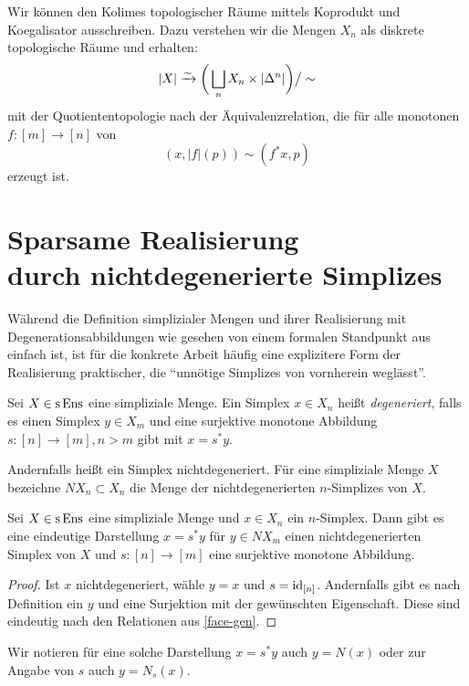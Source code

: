 Wir können den Kolimes topologischer Räume mittels Koprodukt und
Koegalisator ausschreiben. Dazu verstehen wir die Mengen $X_n$ als
diskrete topologische Räume und erhalten:
\[ |X| \xrightarrow[]{\sim} \bigg( \bigsqcup_n X_n \times |\Delta^n| \bigg) \big/ \sim \]
mit der Quotiententopologie nach der Äquivalenzrelation, die für alle
monotonen $f: [m] \to [n]$ von 
\[ (x, |f|(p)) \sim (f^* x, p) \]
erzeugt ist.

\section[Sparsame Realisierung durch nichtdegenerierte Simplizes]
        {\texorpdfstring{Sparsame Realisierung\\durch
            nichtdegenerierte Simplizes}
          {Sparsame Realisierung durch nichtdegenerierte Simplizes}}

Während die Definition simplizialer Mengen und ihrer Realisierung mit
Degenerationsabbildungen wie gesehen von einem formalen Standpunkt aus
einfach ist, ist für die konkrete Arbeit häufig eine explizitere Form
der Realisierung praktischer, die ``unnötige Simplizes von vornherein
weglässt''.
\begin{defn}[\cite{GM}, I.2.9]
  Sei $X \in \operatorname{s}\operatorname{Ens}$ eine simpliziale Menge. Ein Simplex $x \in X_n$
  heißt \emph{degeneriert}, falls es einen Simplex $y \in X_m$ und
  eine surjektive monotone Abbildung $s: [n] \to [m], n > m$ gibt mit
  $x = s^* y$.
\end{defn}
Andernfalls heißt ein Simplex nichtdegeneriert. Für eine simpliziale
Menge $X$ bezeichne $NX_n \subset X_n$ die Menge der
nichtdegenerierten $n$-Simplizes von $X$.
\begin{lemma} \label{degen-repr}
  Sei $X \in \operatorname{s}\operatorname{Ens}$ eine simpliziale Menge und $x \in X_n$ ein
  $n$-Simplex. Dann gibt es eine eindeutige Darstellung $x = s^* y$
  für $y \in NX_m$ einen nichtdegenerierten Simplex von $X$ und $s:
  [n] \to [m]$ eine surjektive monotone Abbildung.
\end{lemma}
\begin{proof}
  Ist $x$ nichtdegeneriert, wähle $y = x$ und $s =
  \operatorname{id}_{[n]}$. Andernfalls gibt es nach Definition ein $y$ und eine
  Surjektion mit der gewünschten Eigenschaft. Diese sind eindeutig
  nach den Relationen aus \ref{face-gen}.
\end{proof}
Wir notieren für eine solche Darstellung $x = s^* y$ auch $y = N(x)$
oder zur Angabe von $s$ auch $y = N_s(x)$.

